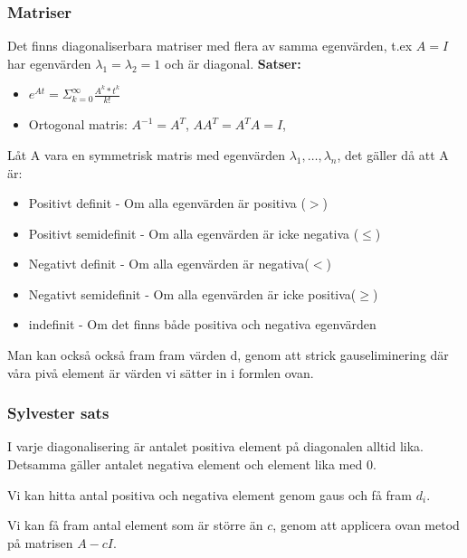 \documentclass[twocolumn,a4paper]{article}
\begin{document}
\subsubsection*{Matriser}
Det finns diagonaliserbara matriser med flera av samma egenvärden, t.ex $A = I$ har egenvärden $\lambda_1 = \lambda_2 = 1$ och är diagonal.
\newline
\textbf{Satser:}
\begin{itemize}
    \item $e^{At} = \Sigma^{\infty}_{k=0} \frac{A^k*t^k}{k!}$
    \item Ortogonal matris: $A^{-1}=A^T$, $AA^T=A^TA=I$, %
    
\end{itemize}

Låt A vara en symmetrisk matris med egenvärden $\lambda_1, \ldots, \lambda_n$, det gäller då att A är:
\begin{itemize}
    \item Positivt definit - Om alla egenvärden är positiva ($>$)
    \item Positivt semidefinit - Om alla egenvärden är icke negativa ($\leq$)
    \item Negativt definit - Om alla egenvärden är negativa($<$)
    \item Negativt semidefinit - Om alla egenvärden är icke positiva($\geq$)
    \item indefinit - Om det finns både positiva och negativa egenvärden
    
\end{itemize}


Man kan också också fram fram värden d, genom att strick gauseliminering där våra pivå element är värden vi sätter in i formlen ovan.



\subsubsection*{Sylvester sats}
I varje diagonalisering är antalet positiva element på diagonalen alltid lika. Detsamma gäller antalet negativa element och element lika med 0.

Vi kan hitta antal positiva och negativa element genom gaus och få fram $d_i$. 

Vi kan få fram antal element som är större än $c$, genom att applicera ovan metod på matrisen $A-cI$.

   
\end{document}
